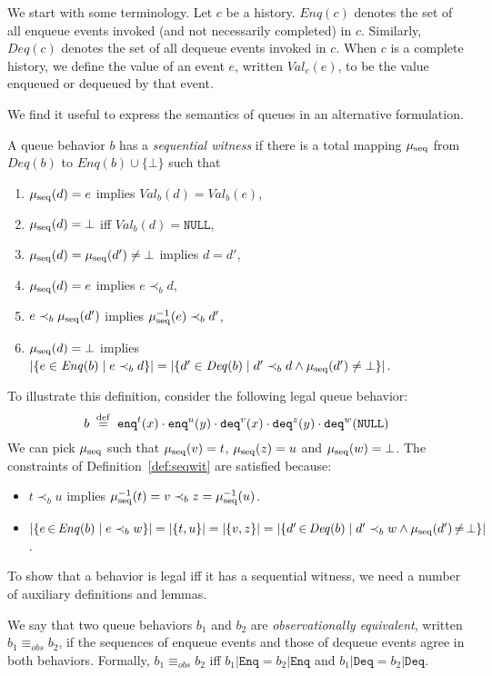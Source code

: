 \documentclass{LMCS}
\newcommand{\defeq}{\;\stackrel{\rm def}{=}\;}
\newcommand{\NULL}{\ensuremath{\mathtt{NULL}}}
\newcommand{\enq}{\ensuremath{\mathtt{enq}}}
\newcommand{\deq}{\ensuremath{\mathtt{deq}}}
\newcommand{\Deq}[1]{\ensuremath{\mathit{Deq}({#1})}}
\newcommand{\Enq}[1]{\ensuremath{\mathit{Enq}({#1})}}
\newcommand{\Val}[2]{\ensuremath{\mathit{Val}_{#1}({#2})}}
\newcommand{\mus}{\mu_{\rm seq}}
\newcommand{\enqset}{\ensuremath{\mathtt{Enq}}}
\newcommand{\deqset}{\ensuremath{\mathtt{Deq}}}
\newcommand{\obsequiv}{\ensuremath{\equiv_{\mathit{obs}}}}
\newcommand\mylabel[1]{\label{#1}}
\begin{document}
We start with some terminology.
Let $c$ be a history. 
$\Enq c$ denotes the set of all enqueue events invoked (and not necessarily completed) in $c$.
Similarly, $\Deq c$ denotes the set of all dequeue events invoked in $c$.
When $c$ is a complete history, we define the value of an event $e$, written $\Val c e$, to be
the value enqueued or dequeued by that event.

We find it useful to express the semantics of queues in an alternative formulation.

\begin{defi}\mylabel{def:seqwit}
A queue behavior $b$ has a {\em sequential witness} if there is a total mapping $\mus$ from $\Deq b$ to $\Enq b\cup\{\bot\}$ such that
\begin{enumerate}[label=(\roman*)]
\item $\mus(d)=e$ implies $\Val b d = \Val b e$, 
\item $\mus(d)=\bot$ iff $\Val b d=\NULL$,
\item $\mus(d)=\mus(d')\neq\bot$ implies $d=d'$,
\item $\mus(d)=e$ implies $e\prec_b d$,
\item $e\prec_b \mus(d')$ implies $\mus^{-1}(e)\prec_b d'$,
\item $\mus(d)=\bot$ implies $|\{e\in\Enq b \mid e\prec_bd\}|=|\{d'\in\Deq b \mid d' \prec_b d\wedge\mus(d') \neq\bot\}|$.
\end{enumerate}
\end{defi}

\noindent To illustrate this definition, consider the following legal queue behavior:
\[
  b \defeq    \enq^t(x) \cdot \enq^u(y) \cdot \deq^v(x)  \cdot \deq^z(y) \cdot \deq^w(\NULL)
\]
We can pick $\mus$ such that $\mus(v)=t$, $\mus(z)=u$ and $\mus(w)=\bot$.
The constraints of Definition~\ref{def:seqwit} are satisfied because:
\begin{itemize}
\item $t\prec_b u$ implies $\mus^{-1}(t)=v \prec_b z=\mus^{-1}(u)$.
\item 
$|\{e\,{\in}\,\Enq b \mid e\prec_b w\}|=|\{t,u\}|=|\{v,z\}|=|\{d'\,{\in}\,\Deq b \mid d'\prec_b w\land \mus(d')\,{\neq}\,\bot\}|$.
\end{itemize}

To show that a behavior is legal iff it has a sequential witness, we need a number of 
auxiliary definitions and lemmas.

We say that two queue behaviors $b_1$ and $b_2$ are {\em observationally equivalent}, written $b_1 \obsequiv b_2$, 
if the sequences of enqueue events and those of dequeue events agree in both behaviors.
Formally, $b_1 \obsequiv b_2$ iff $b_1 | \enqset = b_2 | \enqset$ and $b_1 | \deqset = b_2 | \deqset$.
\end{document}
